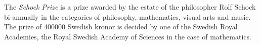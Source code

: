 \documentclass[12pt]{article}
\begin{document}
The {\em Schock Prize} is a prize awarded by the estate of the philosopher Rolf Schock bi-annually in the categories of philosophy, mathematics, visual arts and music. The prize of 400000 Swedish kronor is decided by one of the Swedish Royal Academies, the Royal Swedish Academy of Sciences in the case of mathematics.
\end{document}

